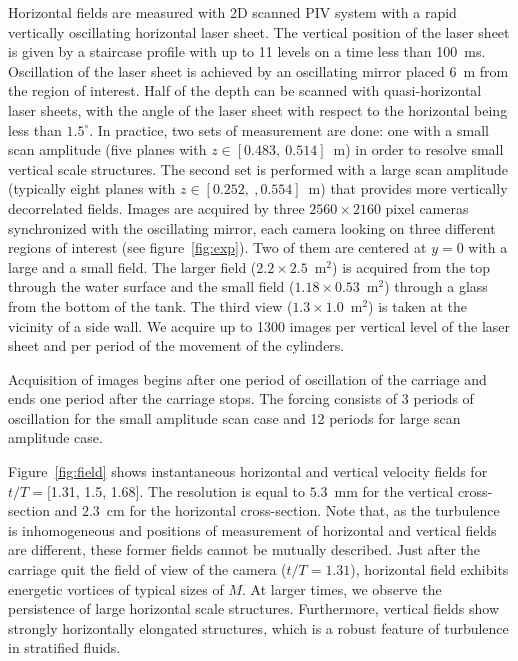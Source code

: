\documentclass[a4paper, 12pt, times]{article}
\begin{document}
\noindent Horizontal fields are measured with 2D scanned PIV system with a
rapid vertically oscillating horizontal laser sheet. The vertical position of
the laser sheet is given by a staircase profile with up to 11 levels on a time
less than 100~ms. Oscillation of the laser sheet is achieved by an
oscillating mirror placed 6~m from the region of interest. Half of the depth can be scanned with quasi-horizontal laser sheets, with the angle of the
laser sheet with respect to the horizontal being less than $1.5^{\circ}$. In
practice, two sets of measurement are done: one with a small scan amplitude
(five planes with $z\in[0.483,~0.514]$~m) in order to resolve small vertical
scale structures. The second set is performed with a large scan amplitude
(typically eight planes with $z\in[0.252,~,0.554]$~m) that provides more
vertically decorrelated fields.
%
Images are acquired by three $2560\times2160$ pixel cameras synchronized with
the oscillating mirror, each camera looking on three different regions of
interest (see figure~\ref{fig:exp}). Two of them are centered at $y=0$ with a
large and a small field. The larger field ($2.2\times2.5$~m$^2$) is acquired
from the top through the water surface and the small field
($1.18\times0.53$~m$^2$) through a glass from the bottom of the tank. The third
view ($1.3\times1.0 $~m$^2$) is taken at the vicinity of a side wall. We
acquire up to 1300 images per vertical level of the laser sheet and per period
of the movement of the cylinders.

\noindent Acquisition of images begins after one period of oscillation of the
carriage and ends one period after the carriage stops. The forcing consists of
3 periods of oscillation for the small amplitude scan case and 12 periods for
large scan amplitude case.

\noindent Figure~\ref{fig:field} shows instantaneous horizontal and vertical velocity
fields for $t/T = [$1.31, 1.5, 1.68$]$. 
%
The resolution is equal to $5.3$~mm for the vertical cross-section and $2.3$~cm
for the horizontal cross-section.
%
Note that, as the turbulence is inhomogeneous and positions of measurement of
horizontal and vertical fields are different, these former fields cannot be
mutually described. Just after the carriage quit the field of view of the
camera ($t/T=1.31$), horizontal field exhibits energetic vortices of typical
sizes of $M$. At larger times, we observe the persistence of large horizontal
scale structures. Furthermore, vertical fields show strongly horizontally
elongated structures, which is a robust feature of turbulence in stratified
fluids.
\end{document}
